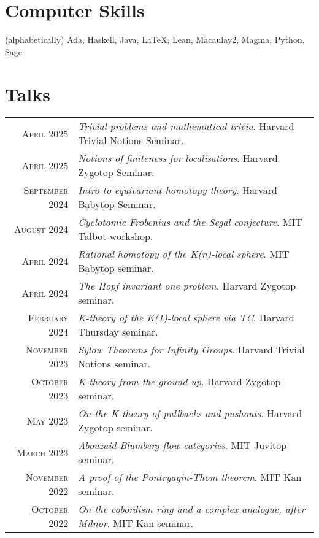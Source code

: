 \documentclass[a4paper,11pt]{article} %
\begin{document}
\section{Computer Skills}

(alphabetically) Ada, Haskell, Java, {\fb \LaTeX}, Lean, Macaulay2, Magma, Python, Sage


\section{Talks}

\begin{tabular}{rl}

\textsc{April} 2025 & \emph{Trivial problems and mathematical trivia}. Harvard Trivial Notions Seminar.\\

\textsc{April} 2025 & \emph{Notions of finiteness for localisations}. Harvard Zygotop Seminar.\\

\textsc{September} 2024 & \emph{Intro to equivariant homotopy theory}. Harvard Babytop Seminar.\\

\textsc{August} 2024 & \emph{Cyclotomic Frobenius and the Segal conjecture}. MIT Talbot workshop.\\

\textsc{April} 2024 & \emph{Rational homotopy of the K(n)-local sphere}. MIT Babytop seminar.\\

\textsc{April} 2024 & \emph{The Hopf invariant one problem}. Harvard Zygotop seminar.\\

\textsc{February} 2024 & \emph{K-theory of the K(1)-local sphere via TC}. Harvard Thursday seminar.\\

\textsc{November} 2023 & \emph{Sylow Theorems for Infinity Groups}. Harvard Trivial Notions seminar.\\

\textsc{October} 2023 & \emph{K-theory from the ground up}. Harvard Zygotop seminar.\\

\textsc{May} 2023 & \emph{On the K-theory of pullbacks and pushouts}. Harvard Zygotop seminar.\\

\textsc{March} 2023 & \emph{Abouzaid-Blumberg flow categories}. MIT Juvitop seminar.\\

\textsc{November} 2022 & \emph{A proof of the Pontryagin-Thom theorem}. MIT Kan seminar.\\

\textsc{October} 2022 & \emph{On the cobordism ring and a complex analogue, after Milnor}. MIT Kan seminar.

\end{tabular}
\end{document}
